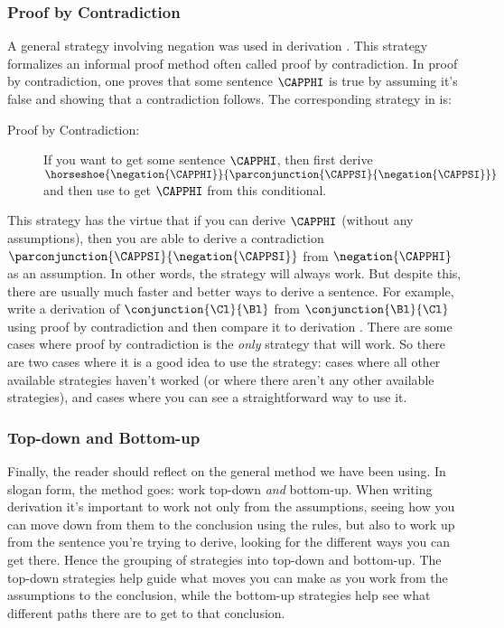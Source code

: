 \subsubsection*{Proof by Contradiction}
A general strategy involving negation was used in derivation . 
This strategy formalizes an informal proof method often called proof by contradiction. 
In proof by contradiction, one proves that some sentence $\CAPPHI$ is true by assuming it's false and showing that a contradiction follows. 
The corresponding strategy in \GSD{} is:
\begin{description}
\item[Proof by Contradiction:] If you want to get some sentence $\CAPPHI$, then first derive $\horseshoe{\negation{\CAPPHI}}{\parconjunction{\CAPPSI}{\negation{\CAPPSI}}}$ and then use  to get $\CAPPHI$ from this conditional.  
\end{description}
This strategy has the virtue that if you can derive $\CAPPHI$ (without any assumptions), then you are able to derive a contradiction $\parconjunction{\CAPPSI}{\negation{\CAPPSI}}$ from $\negation{\CAPPHI}$ as an assumption. In other words, the strategy will always work. But despite this, there are usually much faster and better ways to derive a sentence. 
For example, write a derivation of $\conjunction{\Cl}{\Bl}$ from $\conjunction{\Bl}{\Cl}$ using proof by contradiction and then compare it to derivation . 
There are some cases where proof by contradiction is the \emph{only} strategy that will work. 
So there are two cases where it is a good idea to use the strategy: cases where all other available strategies haven't worked (or where there aren't any other available strategies), and cases where you can see a straightforward way to use it. 

\subsubsection*{Top-down and Bottom-up} Finally, the reader should reflect on the general method we have been using. In slogan form, the method goes: work top-down \emph{and} bottom-up. When writing derivation it's important to work not only from the assumptions, seeing how you can move down from them to the conclusion using the rules, but also to work up from the sentence you're trying to derive, looking for the different ways you can get there. Hence the grouping of strategies into top-down and bottom-up. The top-down strategies help guide what moves you can make as you work from the assumptions to the conclusion, while the bottom-up strategies help see what different paths there are to get to that conclusion. 

